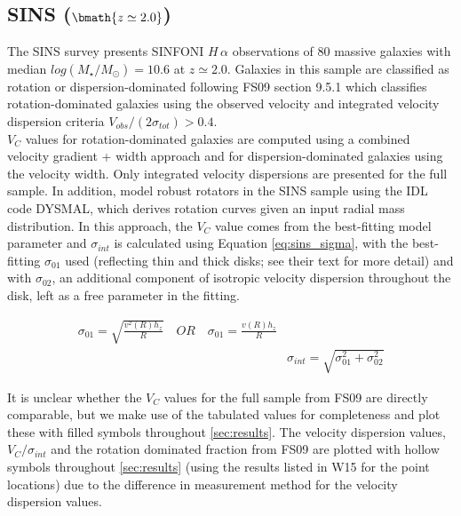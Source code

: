 \documentclass[fleqn,usenatbib]{mnras}
\begin{document}
\subsection{SINS ($\bmath{z\simeq2.0}$)}\label{subsec:SINS}
The SINS survey \citep[FS09]{ForsterSchreiber2009} presents SINFONI $H\,\alpha$ observations of 80 massive galaxies with median $log(M_{\star}/M_{\odot})=10.6$ at $z\simeq2.0$.
Galaxies in this sample are classified as rotation or dispersion-dominated following FS09 section 9.5.1 which classifies rotation-dominated galaxies using the observed velocity and integrated velocity dispersion criteria $V_{obs}/(2\sigma_{tot}) > 0.4$. \\


$V_{C}$ values for rotation-dominated galaxies are computed using a combined velocity gradient + width approach \citep{ForsterSchreiber2006} and for dispersion-dominated galaxies using the velocity width.
Only integrated velocity dispersions are presented for the full sample.
In addition, \citep[C09]{Cresci2009} model robust rotators in the SINS sample using the IDL code DYSMAL, which derives rotation curves given an input radial mass distribution.
In this approach, the $V_{C}$ value comes from the best-fitting model parameter and $\sigma_{int}$ is calculated using Equation \ref{eq:sins_sigma}, with the best-fitting $\sigma_{01}$ used (reflecting thin and thick disks; see their text for more detail) and with $\sigma_{02}$, an additional component of isotropic velocity dispersion throughout the disk, left as a free parameter in the fitting.

\begin{equation}\label{eq:sins_sigma}
\begin{split}
\sigma_{01} = \sqrt{\frac{v^{2}(R)h_{z}}{R}} \quad OR \quad \sigma_{01} = \frac{v(R)h_{z}}{R} \\
& \sigma_{int} = \sqrt{\sigma_{01}^{2} + \sigma_{02}^{2}}
\end{split}
\end{equation}


It is unclear whether the $V_{C}$ values for the full sample from FS09 are directly comparable, but we make use of the tabulated values for completeness and plot these with filled symbols throughout \cref{sec:results}.
The velocity dispersion values, $V_{C}/\sigma_{int}$ and the rotation dominated fraction from FS09 are plotted with hollow symbols throughout \cref{sec:results} (using the results listed in W15 for the point locations) due to the difference in measurement method for the velocity dispersion values.
\end{document}
